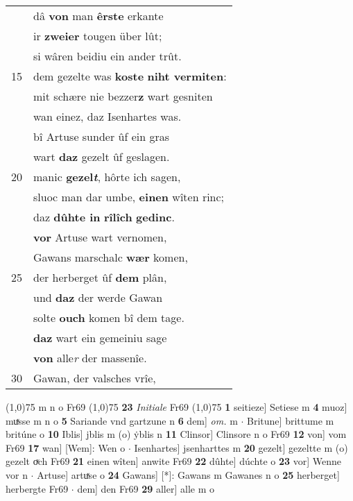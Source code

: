 \documentclass[8pt,a4paper,notitlepage]{article}
\begin{document}
\begin{table}[ht]
\begin{minipage}[t]{0.5\linewidth}
\begin{tabular}{rl}
 & dâ \textbf{von} man \textbf{êrste} erkante\\ 
 & ir \textbf{zweier} tougen über lût;\\ 
 & si wâren beidiu ein ander trût.\\ 
15 & dem gezelte was \textbf{koste} \textbf{niht vermiten}:\\ 
 & mit schære nie bezzer\textbf{z} wart gesniten\\ 
 & wan einez, daz Isenhartes was.\\ 
 & bî Artuse sunder ûf ein gras\\ 
 & wart \textbf{daz} gezelt ûf geslagen.\\ 
20 & manic \textbf{gezel\textit{t}}, hôrte ich sagen,\\ 
 & sluoc man dar umbe, \textbf{einen} wîten rinc;\\ 
 & daz \textbf{dûhte in} \textbf{rîlîch} \textbf{gedinc}.\\ 
 & \textbf{vor} Artuse wart vernomen,\\ 
 & Gawans marschalc \textbf{wær} komen,\\ 
25 & der herberget ûf \textbf{dem} plân,\\ 
 & und \textbf{daz} der werde Gawan\\ 
 & solte \textbf{ouch} komen bî dem tage.\\ 
 & \textbf{daz} wart ein gemeiniu sage\\ 
 & \textbf{von} alle\textit{r} der massenîe.\\ 
30 & Gawan, der valsches vrîe,\\ 
\end{tabular}
\scriptsize
\line(1,0){75} \newline
m n o Fr69 \newline
\line(1,0){75} \newline
\textbf{23} \textit{Initiale} Fr69  \newline
\line(1,0){75} \newline
\textbf{1} seitieze] Setiese m \textbf{4} muoz] muͯsse m n o \textbf{5} Sariande vnd gartzune n \textbf{6} dem] \textit{om.} m  $\cdot$ Britune] brittume m britúne o \textbf{10} Iblis] jblis m (o) ẏblis n \textbf{11} Clinsor] Clinsore n o Fr69 \textbf{12} von] vom Fr69 \textbf{17} wan] [Wem]: Wen o  $\cdot$ Isenhartes] jsenharttes m \textbf{20} gezelt] gezeltte m (o) gezelt oͮch Fr69 \textbf{21} einen wîten] anwite Fr69 \textbf{22} dûhte] dúchte o \textbf{23} vor] Wenne vor n  $\cdot$ Artuse] artuͯse o \textbf{24} Gawans] [*]: Gawans m Gawanes n o \textbf{25} herberget] herbergte Fr69  $\cdot$ dem] den Fr69 \textbf{29} aller] alle m o \newline
\end{minipage}
\end{table}
\end{document}
